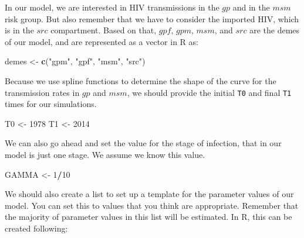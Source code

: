 \documentclass[12pt,]{article}
\newenvironment{Shaded}{\begin{snugshade}}{\end{snugshade}}
\newcommand{\DecValTok}[1]{\textcolor[rgb]{0.00,0.00,0.81}{#1}}
\newcommand{\KeywordTok}[1]{\textcolor[rgb]{0.13,0.29,0.53}{\textbf{#1}}}
\newcommand{\NormalTok}[1]{#1}
\newcommand{\OperatorTok}[1]{\textcolor[rgb]{0.81,0.36,0.00}{\textbf{#1}}}
\newcommand{\StringTok}[1]{\textcolor[rgb]{0.31,0.60,0.02}{#1}}
\begin{document}
In our model, we are interested in HIV transmissions in the \(gp\) and
in the \(msm\) risk group. But also remember that we have to consider
the imported HIV, which is in the \(src\) compartment. Based on that,
\(gpf\), \(gpm\), \(msm\), and \(src\) are the demes of our model, and
are represented as a vector in R as:

\begin{Shaded}
\begin{Highlighting}[]
\NormalTok{demes <-}\StringTok{ }\KeywordTok{c}\NormalTok{(}\StringTok{"gpm"}\NormalTok{, }\StringTok{"gpf"}\NormalTok{, }\StringTok{"msm"}\NormalTok{, }\StringTok{"src"}\NormalTok{)}
\end{Highlighting}
\end{Shaded}

Because we use spline functions to determine the shape of the curve for
the transmission rates in \(gp\) and \(msm\), we should provide the
initial \texttt{T0} and final \texttt{T1} times for our simulations.

\begin{Shaded}
\begin{Highlighting}[]
\NormalTok{T0 <-}\StringTok{ }\DecValTok{1978}
\NormalTok{T1 <-}\StringTok{ }\DecValTok{2014}
\end{Highlighting}
\end{Shaded}

We can also go ahead and set the value for the stage of infection, that
in our model is just one stage. We assume we know this value.

\begin{Shaded}
\begin{Highlighting}[]
\NormalTok{GAMMA <-}\StringTok{ }\DecValTok{1}\OperatorTok{/}\DecValTok{10}
\end{Highlighting}
\end{Shaded}

We should also create a list to set up a template for the parameter
values of our model. You can set this to values that you think are
appropriate. Remember that the majority of parameter values in this list
will be estimated. In R, this can be created following:
\end{document}
